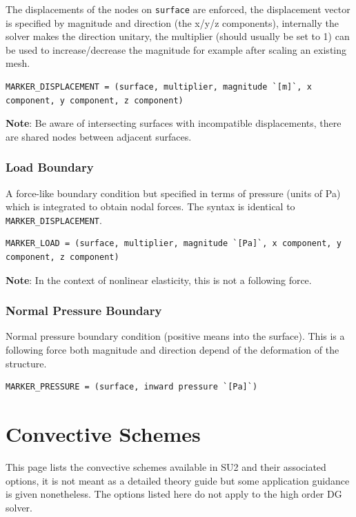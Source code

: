 \documentclass{article}
\begin{document}
The displacements of the nodes on \verb|surface| are enforced, the displacement vector is specified by magnitude and direction (the x/y/z components), internally the solver makes the direction unitary, the multiplier (should usually be set to 1) can be used to increase/decrease the magnitude for example after scaling an existing mesh.

\begin{lstlisting}
MARKER_DISPLACEMENT = (surface, multiplier, magnitude `[m]`, x component, y component, z component)
\end{lstlisting}


\textbf{Note}: Be aware of intersecting surfaces with incompatible displacements, there are shared nodes between adjacent surfaces.

\subsubsection{Load Boundary}

A force-like boundary condition but specified in terms of pressure (units of Pa) which is integrated to obtain nodal forces. The syntax is identical to \verb|MARKER_DISPLACEMENT|.

\begin{lstlisting}
MARKER_LOAD = (surface, multiplier, magnitude `[Pa]`, x component, y component, z component)
\end{lstlisting}


\textbf{Note}: In the context of nonlinear elasticity, this is not a following force.

\subsubsection{Normal Pressure Boundary}

Normal pressure boundary condition (positive means into the surface). This is a following force both magnitude and direction depend of the deformation of the structure.

\begin{lstlisting}
MARKER_PRESSURE = (surface, inward pressure `[Pa]`)
\end{lstlisting}

\newpage
\section{Convective Schemes}
This page lists the convective schemes available in SU2 and their associated options, it is not meant as a detailed theory guide but some application guidance is given nonetheless. The options listed here do not apply to the high order DG solver.
\end{document}

